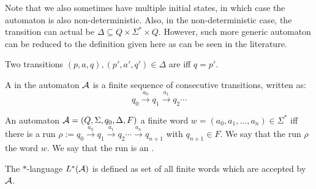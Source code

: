 Note that we also sometimes have multiple initial states, in which case the automaton is also non-deterministic. Also, in the non-deterministic case, the transition can actual be $\Delta \subseteq Q \times \Sigma^* \times Q$. However, such more generic automaton can be reduced to the definition given here as can be seen in the literature.

Two transitions $(p,a,q), (p',a',q') \in \Delta$ are  iff $q=p'$.

A  in the automaton $\mathcal{A}$ is a finite sequence of consecutive transitions, written as:
\[ q_0 \xrightarrow{a_0} q_1 \xrightarrow{a_1} q_2 \cdots \]

An automaton $\mathcal{A} = (Q, \Sigma, q_0, \Delta, F)$  a finite word $w = (a_0,a_1,\dots,a_n) \in \Sigma^*$ iff there is a run $\rho := q_0 \xrightarrow{a_0} q_1 \xrightarrow{a_1} q_2 \cdots \xrightarrow{a_n} q_{n+1}$ with $q_{n+1} \in F$. We say that the run $\rho$  the word $w$. We say that the run is an .

The $*$-language $L^*(\mathcal{A})$ is defined as set of all finite words which are accepted by $\mathcal{A}$.

